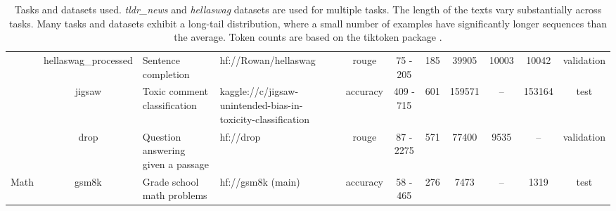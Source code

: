\begin{landscape}
\begin{table}[ht]
{\begin{tabular}{ccllccccccc}
                                   & hellaswag\_processed                & Sentence completion                                                   & hf://Rowan/hellaswag                                         & rouge                            & 75 - 205                                  & 185                                     & 39905          & 10003               & 10042         & validation                                                              \\
                                   & jigsaw                              & Toxic comment classification                                          & kaggle://c/jigsaw-unintended-bias-in-toxicity-classification & accuracy                         & 409 - 715                                 & 601                                     & 159571         & --                  & 153164        & test                                                                    \\
                                   & drop                                & Question answering given a passage                                    & hf://drop                                                    & rouge                            & 87 - 2275                                 & 571                                     & 77400          & 9535                & --            & validation                                                              \\
\midrule
Math                               & gsm8k                               & Grade school math problems                                            & hf://gsm8k (main)                                            & accuracy                         & 58 - 465                                  & 276                                     & 7473           & --                  & 1319          & test                                                                   
\end{tabular}

}

\vspace{10mm}
\captionsetup{type=figure}
\caption{Tasks and datasets used. \textit{tldr\_news} and \textit{hellaswag} datasets are used for multiple tasks. The length of the texts vary substantially across tasks. Many tasks and datasets exhibit a long-tail distribution, where a small number of examples have significantly longer sequences than the average. Token counts are based on the tiktoken package \cite{githubGitHubOpenaitiktoken}. \label{table:datasets}}

\end{table}
\end{landscape}